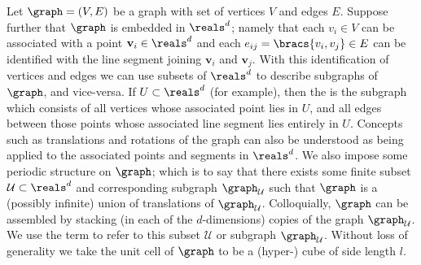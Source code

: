 Let $\graph = (V,E)$ be a graph with set of vertices $V$ and edges $E$.
Suppose further that $\graph$ is embedded in $\reals^{d}$; namely that each $v_{i}\in V$ can be associated with a point $\mathbf{v}_{i}\in\reals^{d}$ and each $e_{ij}=\bracs{v_{i},v_{j}}\in E$ can be identified with the line segment joining $\mathbf{v}_{i}$ and $\mathbf{v}_{j}$.
With this identification of vertices and edges we can use subsets of $\reals^{d}$ to describe subgraphs of $\graph$, and vice-versa.
If $U\subset\reals^{d}$ (for example), then the  is the subgraph which consists of all vertices whose associated point lies in $U$, and all edges between those points whose associated line segment lies entirely in $U$.
Concepts such as translations and rotations of the graph can also be understood as being applied to the associated points and segments in $\reals^{d}$.
We also impose some periodic structure on $\graph$; which is to say that there exists some finite subset $\mathcal{U}\subset\reals^{d}$ and corresponding subgraph $\graph_{\mathcal{U}}$ such that $\graph$ is a (possibly infinite) union of translations of $\graph_{\mathcal{U}}$.
Colloquially, $\graph$ can be assembled by stacking (in each of the $d$-dimensions) copies of the graph $\graph_{\mathcal{U}}$. 
We use the term  to refer to this subset $\mathcal{U}$ or subgraph $\graph_{\mathcal{U}}$. 
Without loss of generality we take the unit cell of $\graph$ to be a (hyper-) cube of side length $l$. \newline

